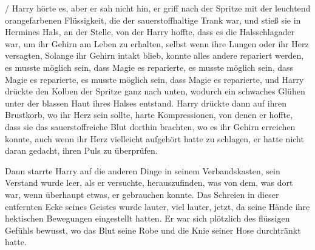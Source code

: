  /  Harry hörte es, aber er sah nicht hin, er griff nach der Spritze mit der leuchtend orangefarbenen Flüssigkeit, die der sauerstoffhaltige Trank war, und stieß sie in Hermines Hals, an der Stelle, von der Harry hoffte, dass es die Halsschlagader war, um ihr Gehirn am Leben zu erhalten, selbst wenn ihre Lungen oder ihr Herz versagten, Solange ihr Gehirn intakt blieb, konnte alles andere repariert werden, es musste möglich sein, dass Magie es reparierte, es musste möglich sein, dass Magie es reparierte, es musste möglich sein, dass Magie es reparierte, und Harry drückte den Kolben der Spritze ganz nach unten, wodurch ein schwaches Glühen unter der blassen Haut ihres Halses entstand. Harry drückte dann auf ihren Brustkorb, wo ihr Herz sein sollte, harte Kompressionen, von denen er hoffte, dass sie das sauerstoffreiche Blut dorthin brachten, wo es ihr Gehirn erreichen konnte, auch wenn ihr Herz vielleicht aufgehört hatte zu schlagen, er hatte nicht daran gedacht, ihren Puls zu überprüfen.

Dann starrte Harry auf die anderen Dinge in seinem Verbandskasten, sein Verstand wurde leer, als er versuchte, herauszufinden, was von dem, was dort war, wenn überhaupt etwas, er gebrauchen konnte.
Das Schreien in dieser entfernten Ecke seines Geistes wurde lauter, viel lauter, jetzt, da seine Hände ihre hektischen Bewegungen eingestellt hatten. Er war sich plötzlich des flüssigen Gefühls bewusst, wo das Blut seine Robe und die Knie seiner Hose durchtränkt hatte.

